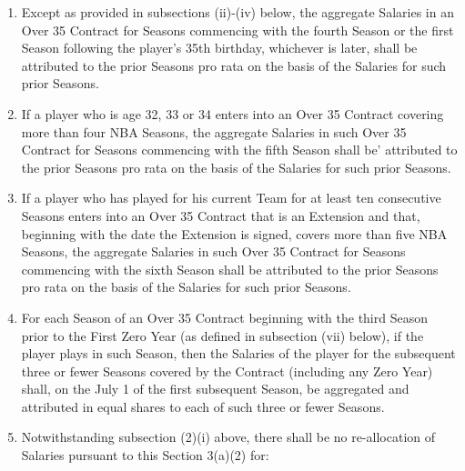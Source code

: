 \documentclass[
]{book}
\providecommand{\tightlist}{%
  \setlength{\itemsep}{0pt}\setlength{\parskip}{0pt}}
\begin{document}
\begin{enumerate}
\begin{enumerate}
    \begin{enumerate}
    \def\labelenumiii{(\roman{enumiii})}
    \tightlist
    \item
      Except as provided in subsections (ii)-(iv) below, the aggregate Salaries in an Over 35 Contract for Seasons commencing with the fourth Season or the first Season following the player's 35th birthday, whichever is later, shall be attributed to the prior Seasons pro rata on the basis of the Salaries for such prior Seasons.
    \item
      If a player who is age 32, 33 or 34 enters into an Over 35 Contract covering more than four NBA Seasons, the aggregate Salaries in such Over 35 Contract for Seasons commencing with the fifth Season shall be' attributed to the prior Seasons pro rata on the basis of the Salaries for such prior Seasons.
    \item
      If a player who has played for his current Team for at least ten consecutive Seasons enters into an Over 35 Contract that is an Extension and that, beginning with the date the Extension is signed, covers more than five NBA Seasons, the aggregate Salaries in such Over 35 Contract for Seasons commencing with the sixth Season shall be attributed to the prior Seasons pro rata on the basis of the Salaries for such prior Seasons.
    \item
      For each Season of an Over 35 Contract beginning with the third Season prior to the First Zero Year (as defined in subsection (vii) below), if the player plays in such Season, then the Salaries of the player for the subsequent three or fewer Seasons covered by the Contract (including any Zero Year) shall, on the July 1 of the first subsequent Season, be aggregated and attributed in equal shares to each of such three or fewer Seasons.
    \item
      Notwithstanding subsection (2)(i) above, there shall be no re-allocation of Salaries pursuant to this Section 3(a)(2) for:


\end{enumerate}
\end{enumerate}
\end{enumerate}
\end{document}
